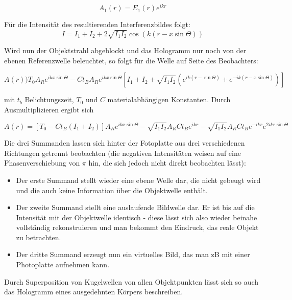 \[
 A_1(r) = E_1(r) e^{ikr}
\]

Für die Intensität des resultierenden Interferenzbildes folgt:
\[
 I = I_1 + I_2 + 2 \sqrt{I_1 I_2} \cos \left( k(r-x \sin \Theta) \right)
\]

Wird nun der Objektstrahl abgeblockt und das Hologramm nur noch von der ebenen Referenzwelle beleuchtet, so folgt für die Welle auf Seite des Beobachters:

\[
 A(r) ) T_0 A_R e^{ikx \sin \Theta} - C t_B A_R e^{ikx \sin \Theta} \left[I_1 + I_2 + \sqrt{I_1 I_2} \left( e^{ik(r-\sin \Theta)} + e^{-ik(r-x \sin \Theta)} \right) \right]
\]

mit $t_b$ Belichtungszeit, $T_0$ und $C$ materialabhängigen Konstanten. Durch Ausmultiplizieren ergibt sich

\[
A(r) = [T_0 - C t_B (I_1 + I_2)] A_R e^{ikx \sin \Theta} - \sqrt{I_1 I_2} A_RCt_Be^{ikr} - \sqrt{I_1I_2} A_RCt_Be^{-ikr}e^{2ikr\sin \Theta} 
\]

Die drei Summanden lassen sich hinter der Fotoplatte aus drei verschiedenen Richtungen getrennt beobachten (die negativen Intensitäten weisen auf eine Phasenverschiebung von $\pi$ hin, die sich jedoch nicht direkt beobachten lässt):
\begin{itemize}
 \item Der erste Summand stellt wieder eine ebene Welle dar, die nicht gebeugt wird und die auch keine Information über die Objektwelle enthält.
 \item Der zweite Summand stellt eine auslaufende Bildwelle dar. Er ist bis auf die Intensität mit der Objektwelle identisch - diese lässt sich also wieder beinahe vollständig rekonstruieren und man bekommt den Eindruck, das reale Objekt zu betrachten.
 \item Der dritte Summand erzeugt nun ein virtuelles Bild, das man zB mit einer Photoplatte aufnehmen kann.
\end{itemize}

Durch Superposition von Kugelwellen von allen Objektpunkten lässt sich so auch das Hologramm eines ausgedehnten Körpers beschreiben.